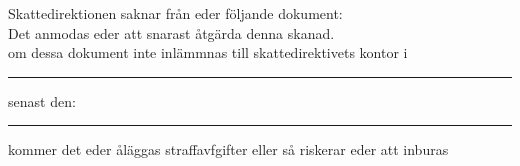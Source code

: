\documentclass{letter}
\begin{document}
Skattedirektionen saknar från eder följande dokument:\\
\vfill
Det anmodas eder att snarast åtgärda denna skanad.\\
om dessa dokument inte inlämmnas till skattedirektivets kontor i\\
\vspace*{1cm}
\hrule
senast den:\\
\vspace*{1cm}
\hrule
kommer det eder  åläggas straffavfgifter eller så riskerar eder att inburas\\
\end{document}
